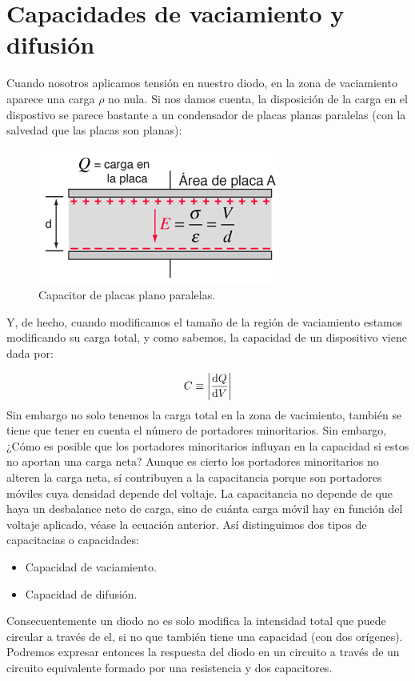 \section{Capacidades de vaciamiento y difusión}

Cuando nosotros aplicamos tensión en nuestro diodo, en la zona de vaciamiento aparece una carga $\rho$ no nula. Si nos damos cuenta, la disposición de la carga en el dispostivo se parece bastante a un condensador de placas planas paralelas (con la salvedad que las placas son planas):

\begin{figure}[h!] \centering
    \includegraphics[width=0.45\linewidth]{Cuerpo/Ch_03/03_Temario_07.png}
    \caption{Capacitor de placas plano paralelas.}
\end{figure}
Y, de hecho, cuando modificamos el tamaño de la región de vaciamiento estamos modificando su carga total, y como sabemos, la capacidad de un dispositivo viene dada por: 

\begin{equation}
    C \equiv \abs{\frac{\mathrm{d} Q}{\mathrm{d} V}}
\end{equation}
Sin embargo no solo tenemos la carga total en la zona de vacimiento, también se tiene que tener en cuenta el número de portadores minoritarios. Sin embargo, ¿Cómo es posible que los portadores minoritarios influyan en la capacidad si estos no aportan una carga neta? Aunque es cierto los portadores minoritarios no alteren la carga neta, sí contribuyen a la capacitancia porque son portadores móviles cuya densidad depende del voltaje. La capacitancia no depende de que haya un desbalance neto de carga, sino de cuánta carga móvil hay en función del voltaje aplicado, véase la ecuación anterior. Así distinguimos dos tipos de capacitacias o capacidades: 

\begin{itemize}
    \item Capacidad de vaciamiento.
    \item Capacidad de difusión.
\end{itemize}
Consecuentemente un diodo no es solo modifica la intensidad total que puede circular a través de el, si no que también tiene una capacidad (con dos orígenes). Podremos expresar entonces la respuesta del diodo en un circuito a través de un circuito equivalente formado por una resistencia y dos capacitores. 

